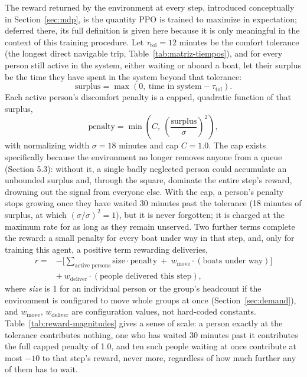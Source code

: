 \documentclass[11pt,a4paper]{article}
\begin{document}
The reward returned by the environment at every step, introduced conceptually in Section~\ref{sec:mdp}, is the quantity PPO is trained to maximize in expectation; deferred there, its full definition is given here because it is only meaningful in the context of this training procedure. Let $\tau_{\text{tol}} = 12$ minutes be the comfort tolerance (the longest direct navigable trip, Table~\ref{tab:matriz-tiempos}), and for every person still active in the system, either waiting or aboard a boat, let their surplus be the time they have spent in the system beyond that tolerance:
\begin{equation}
\text{surplus} = \max(0,\ \text{time in system} - \tau_{\text{tol}}).
\end{equation}
Each active person's discomfort penalty is a capped, quadratic function of that surplus,
\begin{equation}
\text{penalty} = \min\!\left(C,\ \left(\frac{\text{surplus}}{\sigma}\right)^{2}\right),
\end{equation}
with normalizing width $\sigma = 18$ minutes and cap $C = 1.0$. The cap exists specifically because the environment no longer removes anyone from a queue (Section 5.3): without it, a single badly neglected person could accumulate an unbounded surplus and, through the square, dominate the entire step's reward, drowning out the signal from everyone else. With the cap, a person's penalty stops growing once they have waited 30 minutes past the tolerance (18 minutes of surplus, at which $(\sigma/\sigma)^2=1$), but it is never forgotten; it is charged at the maximum rate for as long as they remain unserved. Two further terms complete the reward: a small penalty for every boat under way in that step, and, only for training this agent, a positive term rewarding deliveries,
\begin{equation}
\begin{aligned}
r = {} & -\Bigg[\sum_{\text{active persons}} \text{size} \cdot \text{penalty} \ +\ w_{\text{move}} \cdot (\text{boats under way}) \Bigg] \\
       & +\ w_{\text{deliver}} \cdot (\text{people delivered this step}),
\end{aligned}
\label{eq:reward-agente}
\end{equation}
where \emph{size} is 1 for an individual person or the group's headcount if the environment is configured to move whole groups at once (Section~\ref{sec:demand}), and $w_{\text{move}}$, $w_{\text{deliver}}$ are configuration values, not hard-coded constants. Table~\ref{tab:reward-magnitudes} gives a sense of scale: a person exactly at the tolerance contributes nothing, one who has waited 30 minutes past it contributes the full capped penalty of 1.0, and ten such people waiting at once contribute at most $-10$ to that step's reward, never more, regardless of how much further any of them has to wait.
\end{document}
